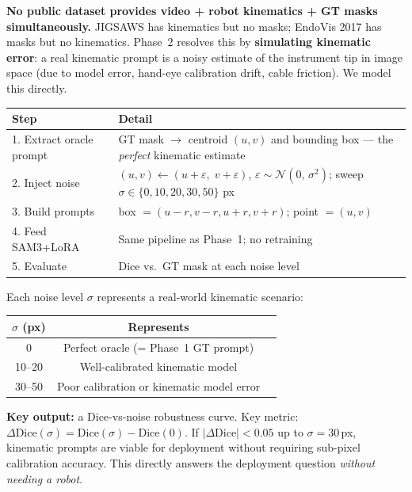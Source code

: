 \documentclass[11pt, a4paper]{article}
\begin{document}
\textbf{No public dataset provides video + robot kinematics + GT masks simultaneously.}
JIGSAWS has kinematics but no masks; EndoVis 2017 has masks but no kinematics.
Phase~2 resolves this by \textbf{simulating kinematic error}: a real kinematic prompt
is a noisy estimate of the instrument tip in image space (due to model error,
hand-eye calibration drift, cable friction). We model this directly.

\begin{center}
\begin{tabular}{lp{9.5cm}}
\toprule
\textbf{Step} & \textbf{Detail} \\
\midrule
1. Extract oracle prompt & GT mask $\to$ centroid $(u,v)$ and bounding box ---
                           the \textit{perfect} kinematic estimate \\
2. Inject noise          & $(u,v) \leftarrow (u + \varepsilon,\; v + \varepsilon)$,
                           $\varepsilon \sim \mathcal{N}(0,\,\sigma^2)$;
                           sweep $\sigma \in \{0, 10, 20, 30, 50\}$ px \\
3. Build prompts         & box $= (u{-}r, v{-}r, u{+}r, v{+}r)$; point $= (u,v)$ \\
4. Feed SAM3+LoRA        & Same pipeline as Phase~1; no retraining \\
5. Evaluate              & Dice vs.\ GT mask at each noise level \\
\bottomrule
\end{tabular}
\end{center}

\noindent Each noise level $\sigma$ represents a real-world kinematic scenario:

\begin{center}
\begin{tabular}{cc p{7cm}}
\toprule
$\sigma$ (px) & \textbf{Represents} \\
\midrule
0   & Perfect oracle (= Phase~1 GT prompt) \\
10--20 & Well-calibrated kinematic model \\
30--50 & Poor calibration or kinematic model error \\
\bottomrule
\end{tabular}
\end{center}

\noindent\textbf{Key output:} a Dice-vs-noise robustness curve.
Key metric: $\Delta\text{Dice}(\sigma) = \text{Dice}(\sigma) - \text{Dice}(0)$.
If $|\Delta\text{Dice}| < 0.05$ up to $\sigma = 30$\,px, kinematic prompts are viable
for deployment without requiring sub-pixel calibration accuracy.
This directly answers the deployment question \textit{without needing a robot}.
\end{document}
